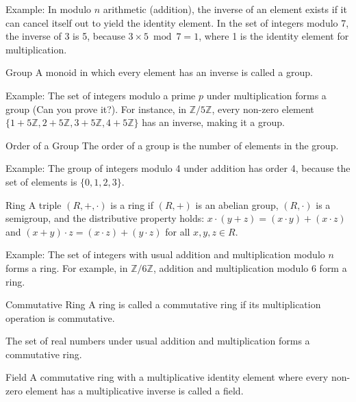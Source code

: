 \documentclass{article}
\begin{document}
Example: In modulo $n$ arithmetic (addition), the inverse of an element exists if it can cancel itself out to yield the identity element. In the set of integers modulo 7, the inverse of 3 is 5, because $3 \times 5 \bmod 7 = 1$, where 1 is the identity element for multiplication.

\begin{definition}{Group}{}
A monoid in which every element has an inverse is called a group.
\end{definition}

Example: The set of integers modulo a prime $p$ under multiplication forms a group (Can you prove it?). For instance, in $\mathbb{Z}/5\mathbb{Z}$, every non-zero element $\{1 + 5\mathbb{Z}, 2 + 5\mathbb{Z}, 3 + 5\mathbb{Z}, 4 + 5\mathbb{Z}\}$ has an inverse, making it a group.

\begin{definition}{Order of a Group}{}
The order of a group is the number of elements in the group.
\end{definition}

Example: The group of integers modulo 4 under addition has order 4, because the set of elements is $\{0, 1, 2, 3\}$.

\begin{definition}{Ring}{}
A triple $(R, +, \cdot)$ is a ring if $(R, +)$ is an abelian group, $(R, \cdot)$ is a semigroup, and the distributive property holds: $x \cdot (y + z) = (x \cdot y) + (x \cdot z)$ and $(x + y) \cdot z = (x \cdot z) + (y \cdot z)$ for all $x, y, z \in R$.
\end{definition}

Example: The set of integers with usual addition and multiplication modulo $n$ forms a ring. For example, in $\mathbb{Z}/6\mathbb{Z}$, addition and multiplication modulo 6 form a ring.

\begin{definition}{Commutative Ring}{}
A ring is called a commutative ring if its multiplication operation is commutative.
\end{definition}

The set of real numbers under usual addition and multiplication forms a commutative ring.

\begin{definition}{Field}{}
A commutative ring with a multiplicative identity element where every non-zero element has a multiplicative inverse is called a field.
\end{definition}
\end{document}
